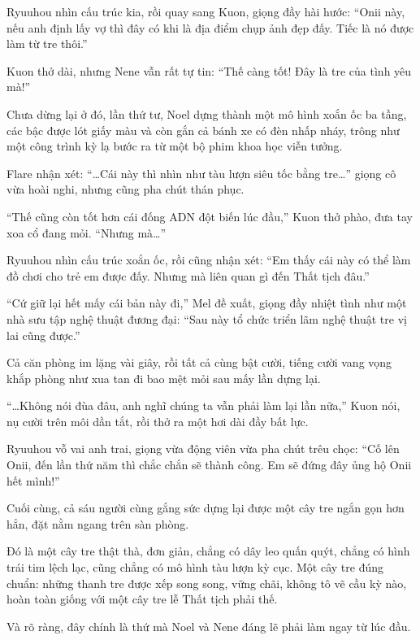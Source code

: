 \documentclass[../main.tex]{subfiles}
\begin{document}
Ryuuhou nhìn cấu trúc kia, rồi quay sang Kuon, giọng đầy hài hước: ``Onii này, nếu anh định lấy vợ thì đây có khi là địa điểm chụp ảnh đẹp đấy. Tiếc là nó được làm từ tre thôi.''

Kuon thở dài, nhưng Nene vẫn rất tự tin: ``Thế càng tốt! Đây là tre của tình yêu mà!''

Chưa dừng lại ở đó, lần thứ tư, Noel dựng thành một mô hình xoắn ốc ba tầng, các bậc được lót giấy màu và còn gắn cả bánh xe có đèn nhấp nháy, trông như một công trình kỳ lạ bước ra từ một bộ phim khoa học viễn tưởng.

Flare nhận xét: ``\dots Cái này thì nhìn như tàu lượn siêu tốc bằng tre\dots'' giọng cô vừa hoài nghi, nhưng cũng pha chút thán phục.

``Thế cũng còn tốt hơn cái đống ADN đột biến lúc đầu,'' Kuon thở phào, đưa tay xoa cổ đang mỏi. ``Nhưng mà\dots''

Ryuuhou nhìn cấu trúc xoắn ốc, rồi cũng nhận xét: ``Em thấy cái này có thể làm đồ chơi cho trẻ em được đấy. Nhưng mà liên quan gì đến Thất tịch đâu.''

``Cứ giữ lại hết mấy cái bản này đi,'' Mel đề xuất, giọng đầy nhiệt tình như một nhà sưu tập nghệ thuật đương đại: ``Sau này tổ chức triển lãm nghệ thuật tre vị lai cũng được.''

Cả căn phòng im lặng vài giây, rồi tất cả cùng bật cười, tiếng cười vang vọng khắp phòng như xua tan đi bao mệt mỏi sau mấy lần dựng lại.

``\dots Không nói đùa đâu, anh nghĩ chúng ta vẫn phải làm lại lần nữa,'' Kuon nói, nụ cười trên môi dần tắt, rồi thở ra một hơi dài đầy bất lực.

Ryuuhou vỗ vai anh trai, giọng vừa động viên vừa pha chút trêu chọc: ``Cố lên Onii, đến lần thứ năm thì chắc chắn sẽ thành công. Em sẽ đứng đây ủng hộ Onii hết mình!''

\ct

Cuối cùng, cả sáu người cùng gắng sức dựng lại được một cây tre ngắn gọn hơn hẳn, đặt nằm ngang trên sàn phòng.


Đó là một cây tre thật thà, đơn giản, chẳng có dây leo quấn quýt, chẳng có hình trái tim lệch lạc, cũng chẳng có mô hình tàu lượn kỳ cục. Một cây tre đúng chuẩn: những thanh tre được xếp song song, vững chãi, không tô vẽ cầu kỳ nào, hoàn toàn giống với một cây tre lễ Thất tịch phải thế.

Và rõ ràng, đây chính là thứ mà Noel và Nene đáng lẽ phải làm ngay từ lúc đầu.
\end{document}
